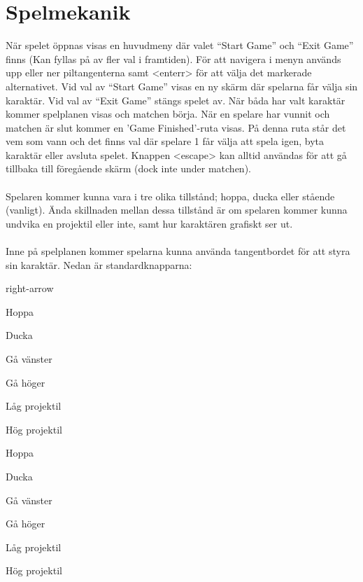 \documentclass{TDP003mall}
\begin{document}
\newpage

\section{Spelmekanik}
När spelet öppnas visas en huvudmeny där valet “Start Game” och “Exit Game” finns (Kan fyllas på av fler val i framtiden). För att navigera i menyn används upp eller ner piltangenterna samt <enterr> för att välja det markerade alternativet. Vid val av “Start Game” visas en ny skärm där spelarna får välja sin karaktär. Vid val av “Exit Game” stängs spelet av. När båda har valt karaktär kommer spelplanen visas och matchen börja. När en spelare har vunnit och matchen är slut kommer en 'Game Finished'-ruta visas. På denna ruta står det vem som vann och det finns val där spelare 1 får välja att spela igen, byta karaktär eller avsluta spelet. Knappen <escape> kan alltid användas för att gå tillbaka till föregående skärm (dock inte under matchen).
\\ \\
Spelaren kommer kunna vara i tre olika tillstånd; hoppa, ducka eller stående (vanligt). Ända skillnaden mellan dessa tillstånd är om spelaren kommer kunna undvika en projektil eller inte, samt hur karaktären grafiskt ser ut.
\\ \\
Inne på spelplanen kommer spelarna kunna använda tangentbordet för att styra sin karaktär. Nedan är standardknapparna:
\begin{labeling}{right-arrow}
    \item [• Spelare 1:]
    \item [W] Hoppa
    \item [S] Ducka
    \item [A] Gå vänster
    \item [D] Gå höger
    \item [T] Låg projektil
    \item [Y] Hög projektil
    \item []
    \item [• Spelare 2:]
    \item [up-arrow] Hoppa
    \item [down-arrow] Ducka
    \item [left-arrow] Gå vänster
    \item [right-arrow] Gå höger
    \item [.] Låg projektil
    \item [-] Hög projektil
\end{labeling}
\end{document}
